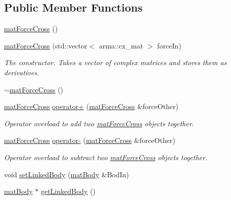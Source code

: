 \subsection*{Public Member Functions}
\begin{DoxyCompactItemize}
\item 
\hyperlink{classosea_1_1ofreq_1_1mat_force_cross_a8ceccb692bece20135f104f2f78dcf20}{mat\-Force\-Cross} ()
\item 
\hyperlink{classosea_1_1ofreq_1_1mat_force_cross_a7887135f4a9ee649d161ca5ca649675f}{mat\-Force\-Cross} (std\-::vector$<$ arma\-::cx\-\_\-mat $>$ force\-In)
\begin{DoxyCompactList}\small\item\em The constructor. Takes a vector of complex matrices and stores them as derivatives. \end{DoxyCompactList}\item 
\hyperlink{classosea_1_1ofreq_1_1mat_force_cross_a2eb0a76db0d4f994287d8368699bb036}{$\sim$mat\-Force\-Cross} ()
\item 
\hyperlink{classosea_1_1ofreq_1_1mat_force_cross}{mat\-Force\-Cross} \hyperlink{classosea_1_1ofreq_1_1mat_force_cross_a9cb8a17edf38bebb728ff47261175614}{operator+} (\hyperlink{classosea_1_1ofreq_1_1mat_force_cross}{mat\-Force\-Cross} \&force\-Other)
\begin{DoxyCompactList}\small\item\em Operator overload to add two \hyperlink{classosea_1_1ofreq_1_1mat_force_cross}{mat\-Force\-Cross} objects together. \end{DoxyCompactList}\item 
\hyperlink{classosea_1_1ofreq_1_1mat_force_cross}{mat\-Force\-Cross} \hyperlink{classosea_1_1ofreq_1_1mat_force_cross_af22b49c1536dc753f99b34a3eba1c8e7}{operator-\/} (\hyperlink{classosea_1_1ofreq_1_1mat_force_cross}{mat\-Force\-Cross} \&force\-Other)
\begin{DoxyCompactList}\small\item\em Operator overload to subtract two \hyperlink{classosea_1_1ofreq_1_1mat_force_cross}{mat\-Force\-Cross} objects together. \end{DoxyCompactList}\item 
void \hyperlink{classosea_1_1ofreq_1_1mat_force_cross_a546ca085994682e1e8160ce3014ffaae}{set\-Linked\-Body} (\hyperlink{classosea_1_1ofreq_1_1mat_body}{mat\-Body} \&Bod\-In)
\item 
\hyperlink{classosea_1_1ofreq_1_1mat_body}{mat\-Body} $\ast$ \hyperlink{classosea_1_1ofreq_1_1mat_force_cross_a240be184a1a56ac5541ea0acfbcb9ec5}{get\-Linked\-Body} ()

\end{DoxyCompactItemize}
